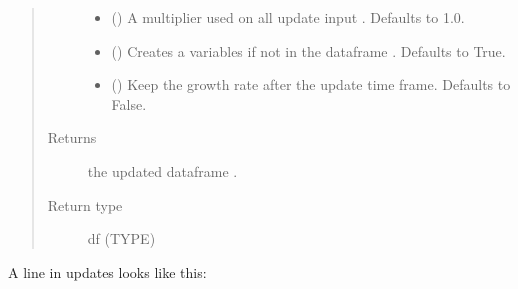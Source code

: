 \documentclass[letterpaper,10pt,english]{sphinxmanual}
\begin{document}
\begin{fulllineitems}
\begin{fulllineitems}
\begin{quote}
\begin{description}
\begin{itemize}
\item {} 
\sphinxAtStartPar
{} (\sphinxstyleliteralemphasis{\sphinxupquote{, }}) \textendash{} A multiplier used on all update input . Defaults to 1.0.

\item {} 
\sphinxAtStartPar
{} (\sphinxstyleliteralemphasis{\sphinxupquote{, }}) \textendash{} Creates a variables if not in the dataframe . Defaults to True.

\item {} 
\sphinxAtStartPar
{} (\sphinxstyleliteralemphasis{\sphinxupquote{, }}) \textendash{} Keep the growth rate after the update time frame. Defaults to False.

\end{itemize}

\item[{Returns}] \leavevmode
\sphinxAtStartPar
the updated dataframe .

\item[{Return type}] \leavevmode
\sphinxAtStartPar
df (TYPE)

\end{description}\end{quote}

\sphinxAtStartPar
A line in updates looks like this:

\begin{sphinxVerbatim}[commandchars=\\\{\}]
\PYG{p}{[}\PYG{p}{[}\PYG{p}{[}\PYG{p}{]} \PYG{p}{]}\PYG{p}{]}    \PYG{p}{[}\PYG{p}{]}
\end{sphinxVerbatim}


\end{fulllineitems}
\end{fulllineitems}
\end{document}

